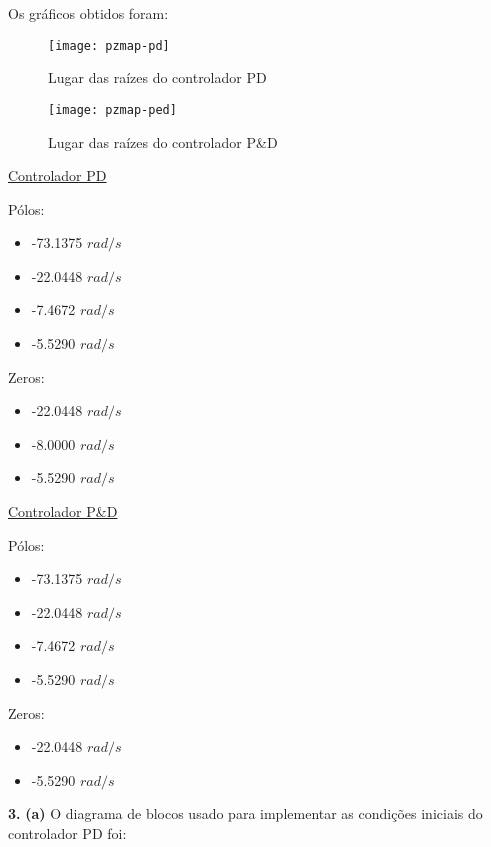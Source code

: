 \documentclass[a4paper,11pt]{article}
\begin{document}
\pagebreak

Os gráficos obtidos foram:

\begin{figure}[H]
\centering
\texttt{[image: pzmap-pd]}
\caption{Lugar das raízes do controlador PD}
\end{figure}

\begin{figure}[H]
\centering
\texttt{[image: pzmap-ped]}
\caption{Lugar das raízes do controlador P\&D}
\end{figure}

\underline{Controlador PD}

\begin{multicols}{2}
    Pólos:
    \begin{itemize}
        \item -73.1375 $rad/s$
        \item -22.0448 $rad/s$
        \item -7.4672 $rad/s$
        \item -5.5290 $rad/s$
    \end{itemize}
\columnbreak
    Zeros:
    \begin{itemize}
        \item -22.0448 $rad/s$
        \item -8.0000 $rad/s$
        \item -5.5290 $rad/s$
    \end{itemize}
\end{multicols}

\underline{Controlador P\&D}

\begin{multicols}{2}
    Pólos:
    \begin{itemize}
        \item -73.1375 $rad/s$
        \item -22.0448 $rad/s$
        \item -7.4672 $rad/s$
        \item -5.5290 $rad/s$
    \end{itemize}
\columnbreak
    Zeros:
    \begin{itemize}
        \item -22.0448 $rad/s$
        \item -5.5290 $rad/s$
    \end{itemize}
\end{multicols}

\textbf{3.} \textbf{(a)}
O diagrama de blocos usado para implementar as condições iniciais do controlador
PD foi:
\end{document}
